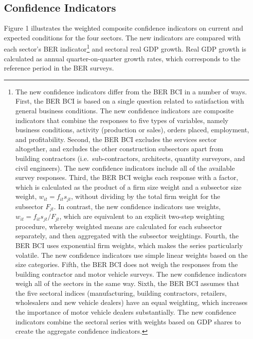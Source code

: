 \documentclass[11pt,]{article}
\let\rmarkdownfootnote\footnote%
\def\footnote{\protect\rmarkdownfootnote}
\begin{document}
\subsection{Confidence Indicators}\label{confidence-indicators}

Figure 1 illustrates the weighted composite confidence indicators on
current and expected conditions for the four sectors. The new indicators
are compared with each sector's BER indicator\footnote{The new
  confidence indicators differ from the BER BCI in a number of ways.
  First, the BER BCI is based on a single question related to
  satisfaction with general business conditions. The new confidence
  indicators are composite indicators that combine the responses to five
  types of variables, namely business conditions, activity (production
  or sales), orders placed, employment, and profitability. Second, the
  BER BCI excludes the services sector altogether, and excludes the
  other construction subsectors apart from building contractors
  (i.e.~sub-contractors, architects, quantity surveyors, and civil
  engineers). The new confidence indicators include all of the available
  survey responses. Third, the BER BCI weighs each response with a
  factor, which is calculated as the product of a firm size weight and a
  subsector size weight, \(w_{it} = f_{it} s_{jt}\), without dividing by
  the total firm weight for the subsector \(F_{jt}\). In contrast, the
  new confidence indicators use weights,
  \(w_{it} = f_{it} s_{jt} / F_{jt}\), which are equivalent to an
  explicit two-step weighting procedure, whereby weighted means are
  calculated for each subsector separately, and then aggregated with the
  subsector weightings. Fourth, the BER BCI uses exponential firm
  weights, which makes the series particularly volatile. The new
  confidence indicators use simple linear weights based on the size
  categories. Fifth, the BER BCI does not weigh the responses from the
  building contractor and motor vehicle surveys. The new confidence
  indicators weigh all of the sectors in the same way. Sixth, the BER
  BCI assumes that the five sectoral indices (manufacturing, building
  contractors, retailers, wholesalers and new vehicle dealers) have an
  equal weighting, which increases the importance of motor vehicle
  dealers substantially. The new confidence indicators combine the
  sectoral series with weights based on GDP shares to create the
  aggregate confidence indicators.} and sectoral real GDP growth. Real
GDP growth is calculated as annual quarter-on-quarter growth rates,
which corresponds to the reference period in the BER surveys.
\end{document}
